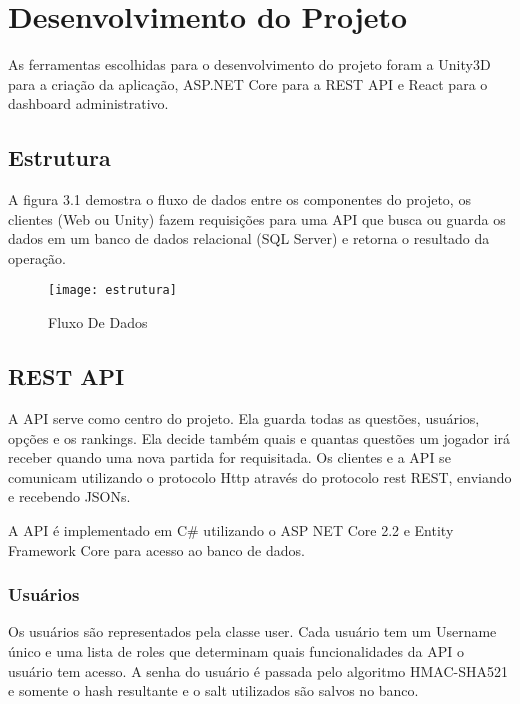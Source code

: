 \chapter{Desenvolvimento do Projeto}
\label{chap:desenv}

As ferramentas escolhidas para o desenvolvimento do projeto foram a Unity3D para a criação da aplicação, ASP.NET Core para a REST API e React para o dashboard administrativo.
 
\section{Estrutura}
\label{sec:estrutura}

A figura 3.1 demostra o fluxo de dados entre os componentes do projeto, os clientes (Web ou Unity) fazem requisições  para uma API que busca ou guarda os dados em um banco de dados relacional (SQL Server) e retorna o resultado da operação.

\begin{figure}[htb]
\caption{\label{fig:estrutura} Fluxo De Dados }
\begin{center}
\texttt{[image: estrutura]}
\end{center}
\end{figure}


\section{REST API}
\label{sec:restapi}


A API serve como centro do projeto. Ela guarda todas as questões, usuários, opções e os rankings. Ela decide também quais e quantas questões um jogador irá receber quando uma nova partida for requisitada. 
Os clientes e a API se comunicam utilizando o protocolo Http\cite{rcfHttp} através do protocolo rest  REST\cite{wwrest}, enviando e recebendo JSONs.

A API é implementado em C\# utilizando o ASP NET Core 2.2\cite{aspnetcore} e Entity Framework Core\cite{entityFramework} para acesso ao banco de dados.

\subsection{Usuários}
\label{subsec:usuários}

Os usuários são representados pela classe user. Cada usuário tem um Username único e uma lista de roles que determinam quais funcionalidades da API o usuário tem acesso. A senha do usuário é passada pelo algoritmo HMAC-SHA521\cite{rcfHAMAC} e somente o hash resultante e o salt utilizados são salvos no banco.

